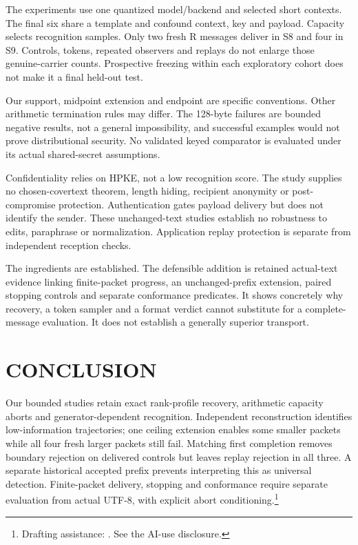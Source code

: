 \documentclass[a4paper,twoside]{article}
\newcommand{\aidraft}{\footnote{Drafting assistance: \cite{openai2026codex}. See the AI-use disclosure.}}
\begin{document}
The experiments use one quantized model/backend and selected short contexts. The final six share a template and confound context, key and payload. Capacity selects recognition samples. Only two fresh R messages deliver in S8 and four in S9. Controls, tokens, repeated observers and replays do not enlarge those genuine-carrier counts. Prospective freezing within each exploratory cohort does not make it a final held-out test.

Our support, midpoint extension and endpoint are specific conventions. Other arithmetic termination rules may differ. The 128-byte failures are bounded negative results, not a general impossibility, and successful examples would not prove distributional security. No validated keyed comparator is evaluated under its actual shared-secret assumptions.

Confidentiality relies on HPKE, not a low recognition score. The study supplies no chosen-covertext theorem, length hiding, recipient anonymity or post-compromise protection. Authentication gates payload delivery but does not identify the sender. These unchanged-text studies establish no robustness to edits, paraphrase or normalization. Application replay protection is separate from independent reception checks.

The ingredients are established. The defensible addition is retained actual-text evidence linking finite-packet progress, an unchanged-prefix extension, paired stopping controls and separate conformance predicates. It shows concretely why recovery, a token sampler and a format verdict cannot substitute for a complete-message evaluation. It does not establish a generally superior transport.

\section{CONCLUSION}
\label{sec:conclusion}
\noindent Our bounded studies retain exact rank-profile recovery, arithmetic capacity aborts and generator-dependent recognition. Independent reconstruction identifies low-information trajectories; one ceiling extension enables some smaller packets while all four fresh larger packets still fail. Matching first completion removes boundary rejection on delivered controls but leaves replay rejection in all three. A separate historical accepted prefix prevents interpreting this as universal detection. Finite-packet delivery, stopping and conformance require separate evaluation from actual UTF-8, with explicit abort conditioning.\aidraft
\end{document}
